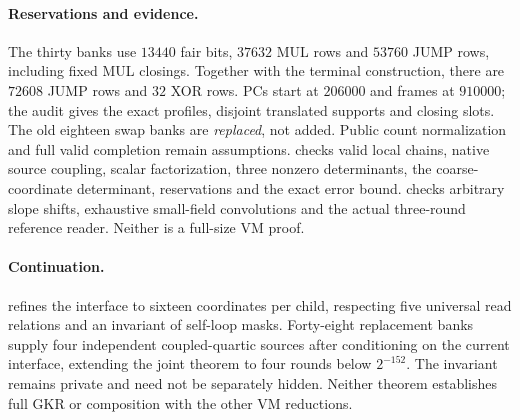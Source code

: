 \paragraph{Reservations and evidence.} The thirty banks use $13440$ fair bits, $37632$ MUL rows and $53760$ JUMP rows, including fixed MUL closings. Together with the terminal construction, there are $72608$ JUMP rows and $32$ XOR rows. PCs start at $206000$ and frames at $910000$; the audit gives the exact profiles, disjoint translated supports and closing slots. The old eighteen swap banks are \emph{replaced}, not added. Public count normalization and full valid completion remain assumptions.  checks valid local chains, native source coupling, scalar factorization, three nonzero determinants, the coarse-coordinate determinant, reservations and the exact error bound.  checks arbitrary slope shifts, exhaustive small-field convolutions and the actual three-round reference reader. Neither is a full-size VM proof.

\paragraph{Continuation.}  refines the interface to sixteen coordinates per child, respecting five universal read relations and an invariant of self-loop masks. Forty-eight replacement banks supply four independent coupled-quartic sources after conditioning on the current interface, extending the joint theorem to four rounds below $2^{-152}$. The invariant remains private and need not be separately hidden. Neither theorem establishes full GKR or composition with the other VM reductions.
